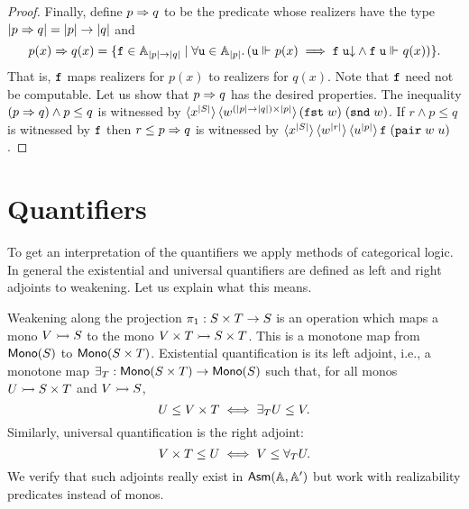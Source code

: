 \begin{proof}
  Finally, define $p \Rightarrow q$ to be the predicate whose realizers have
  the type $|p \Rightarrow q| = |p| \to |q|$ and
  \begin{equation*}
    p(x) \Rightarrow q(x) = \{
      \mathtt{f} \in \mathbb{A}_{|p| \to |q|} \mid
      \forall \mathtt{u} \in \mathbb{A}_{|p|} .\,
        (\mathtt{u} \Vdash_{} p(x)
        \implies
        \mathtt{f}\;\mathtt{u}{\downarrow} \land
        \mathtt{f}\;\mathtt{u} \Vdash_{} q(x))
    \}.
  \end{equation*}
  That is, $\mathtt{f}$ maps realizers for $p(x)$ to realizers for $q(x)$.
  Note that $\mathtt{f}$ need not be computable. Let us show that $p \Rightarrow
  q$ has the desired properties. The inequality $(p \Rightarrow q) \land p
  \leq q$ is witnessed by $\langle x^{|S|} \rangle\, \langle w^{(|p| \to
      |q|) \times |p|} \rangle\,{(\mathtt{fst}\;w)\; (\mathtt{snd}\;w)}$. If $r \land p
  \leq q$ is witnessed by $\mathtt{f}$ then $r \leq p \Rightarrow q$ is witnessed
  by $\langle x^{|S|} \rangle\, \langle w^{|r|} \rangle\,
    \langle u^{|p|} \rangle\, \mathtt{f}\;(\mathtt{pair}\;w\;u)$.
\end{proof}

\section{Quantifiers}
\label{sec:quantifiers}

To get an interpretation of the quantifiers we apply methods of
categorical logic. In general the existential and universal
quantifiers are defined as left and right adjoints to weakening. Let
us explain what this means.

Weakening along the projection $\pi_1 : S \times T \to
S$ is an operation which maps a mono $V \rightarrowtail S$
to the mono $V \times T \rightarrowtail S \times T$.
This is a monotone map from $\mathsf{Mono}(S)$ to $\mathsf{Mono}(S \times
  T)$. Existential quantification is its left adjoint, i.e., a
monotone map $\exists_{T} : \mathsf{Mono}(S \times T) \to
\mathsf{Mono}(S)$ such that, for all monos $U \rightarrowtail S
\times T$ and $V \rightarrowtail S$,
%
\begin{equation*}
  U \leq V \times T
  \iff
  \exists_{T} U \leq V.
\end{equation*}
%
Similarly, universal quantification is the right adjoint:
%
\begin{equation*}
  V \times T \leq U
  \iff
  V \leq \forall_{T} U.
\end{equation*}
%
We verify that such adjoints really exist in $\mathsf{Asm}(\mathbb{A},\mathbb{A}')$ but work with
realizability predicates instead of monos.

